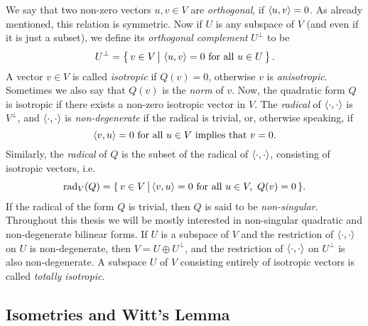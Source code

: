 We say that two non-zero vectors $u,v \in V$ are \textit{orthogonal}, if $\langle u, v \rangle = 0$. As
already mentioned, this relation is symmetric. Now if $U$ is any subspace of $V$ (and even if 
it is just a subset), we define its \textit{orthogonal complement} $U^{\perp}$ to be
\begin{equation}
	U^{\perp} = \left\{\, v \in V\, \big|\ \langle u, v \rangle = 0\ \mbox{for all}\  u \in U\,\right\}.
\end{equation}
A vector $v\in V$ is called \textit{isotropic} if $Q(v) = 0$, otherwise
$v$ is \textit{anisotropic}. Sometimes we also say that $Q(v)$ is the \textit{norm} of
$v$. Now, the quadratic form $Q$ is isotropic if there exists a non-zero isotropic vector in $V$. 
The \textit{radical} of $\langle \cdot, \cdot \rangle$ is $V^{\perp}$, and $\langle \cdot, \cdot \rangle$ is 
\textit{non-degenerate} if the radical is trivial, or, otherwise speaking, if
\begin{equation}
	\langle v, u \rangle = 0\ \mbox{for all}\ u \in V \mbox{ implies that } v = 0.
\end{equation}
Similarly, the \textit{radical} of $Q$ is 
the subset of the radical of $\langle \cdot, \cdot \rangle$, consisting of isotropic vectors, i.e.
\begin{equation}
	\label{eq:quadratic_form_radical}
	\mathrm{rad}_V(Q) = \{\, v \in V\, \big|\, \inner{v}{u} = 0\ \mbox{for all}\ u \in V,\ 
		Q(v) = 0\,\}.
\end{equation}
If the radical of the form $Q$ is trivial, then $Q$ is said to be
\textit{non-singular}. Throughout this thesis we will be mostly 
interested in non-singular quadratic and non-degenerate bilinear forms.
If $U$ is a subspace of $V$ and the restriction of $\langle \cdot, \cdot \rangle$ on $U$ 
is non-degenerate, then $V = U \oplus U^{\perp}$, and the restriction of $\langle \cdot, \cdot \rangle$
on $U^{\perp}$ is also non-degenerate. A subspace $U$ of $V$ consisting entirely of isotropic vectors is called \textit{totally isotropic}.

\subsection{Isometries and Witt's Lemma}

